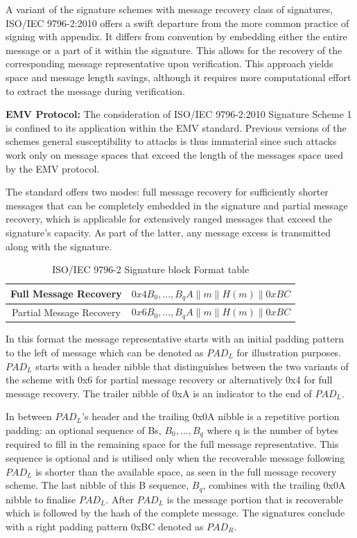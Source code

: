 \documentclass[]{final_report}
\theoremstyle{definition}
\begin{document}
A variant of the signature schemes with message recovery class of signatures, ISO/IEC 9796-2:2010 offers a swift departure from the more common practice of signing with appendix. It differs from convention by embedding either the entire message or a part of it within the signature. This allows for the recovery of the corresponding message representative upon verification. This approach yields space and message length savings, although it requires more computational effort to extract the message during verification.

\textbf{EMV Protocol:} The consideration of ISO/IEC 9796-2:2010 Signature Scheme 1 is confined to its application within the EMV standard. Previous versions of the schemes general susceptibility to attacks \cite{10.1007/3-540-48405-1_1, coron2016practical} is thus immaterial since such attacks work only on message spaces that exceed the length of the messages space used by the EMV protocol.

The standard offers two modes: full message recovery for sufficiently shorter messages that can be completely embedded in the signature and partial message recovery, which is applicable for extensively ranged messages that exceed the signature's capacity. As part of the latter, any message excess is transmitted along with the signature.

\begin{table}[H]
    \centering
    \caption{ISO/IEC 9796-2 Signature block Format table}
    \begin{tabular}{|c|c|}
    \hline
    Full Message Recovery & $0x4B_{0},...,B_{q}A\|m\|H(m)\|0xBC$ \\
    \hline
    Partial Message Recovery & $0x6B_{0},...,B_{q}A\|m\|H(m)\|0xBC$ \\
    \hline
    \end{tabular}
    \label{tab:sig_block_tab}
\end{table}
In this format the message representative starts with an initial padding pattern to the left of message which can be denoted as $PAD_L$ for illustration purposes. $PAD_L$ starts with a header nibble that distinguishes between the two variants of the scheme with 0x6 for partial message recovery or alternatively 0x4 for full message recovery. The trailer nibble of 0xA is an indicator to the end of $PAD_L$. 

In between $PAD_L$'s header and the trailing 0x0A nibble is a repetitive portion padding: an optional sequence of Bs, $B_{0},...,B_{q}$ where q is the number of bytes required to fill in the remaining space for the full message representative. This sequence is optional and is utilised only when the recoverable message following $PAD_L$ is shorter than the available space, as seen in the full message recovery scheme. The last nibble of this B sequence, $B_{q}$, combines with the trailing 0x0A nibble to finalise $PAD_L$.
After $PAD_L$ is the message portion that is recoverable which is followed by the hash of the complete message. The signatures conclude with a right padding pattern 0xBC denoted as $PAD_R$.
\end{document}
